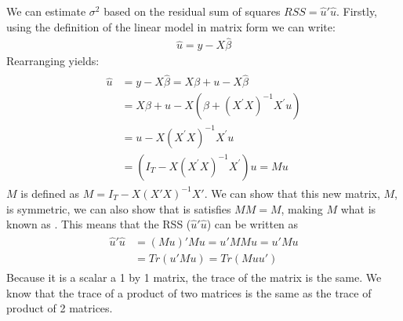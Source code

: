 \documentclass[letterpaper,10pt,english]{jupyterBook}
\begin{document}
We can estimate \(\sigma^2\) based on the residual sum of squares \(RSS = \hat u'\hat u\). Firstly, using the definition of the linear model in matrix form we can write:
\begin{equation*}
\begin{split}\hat u = y - X\hat\beta\end{split}
\end{equation*}
Rearranging yields:
\begin{equation*}
\begin{split}
\begin{aligned}
\hat{u} &=y-X \hat{\beta}=X \beta+u-X \hat{\beta} \\
&=X \beta+u-X\left(\beta+\left(X^{\prime} X\right)^{-1} X^{\prime} u\right) \\
&=u-X\left(X^{\prime} X\right)^{-1} X^{\prime} u \\
&=\left(I_{T}-X\left(X^{\prime} X\right)^{-1} X^{\prime}\right) u=M u
\end{aligned}
\end{split}
\end{equation*}
\(M\) is defined as \(M = I_T - X(X'X)^{-1} X'\). We can show that this new matrix, \(M\), is symmetric, we can also show that is satisfies \(MM  = M\), making \(M\) what is known as . This
means that the RSS (\(\hat u ' \hat u\)) can be written as
\begin{equation*}
\begin{split}\begin{aligned}
    \hat u ' \hat u &= (Mu)'Mu = u'MMu = u'Mu \\
    &= Tr(u'Mu) = Tr(Muu')\end{aligned}\end{split}
\end{equation*}
Because it is a scalar a 1 by 1 matrix, the trace of the matrix is the
same. We know that the trace of a product of two matrices is the same as
the trace of product of 2 matrices.
\end{document}
